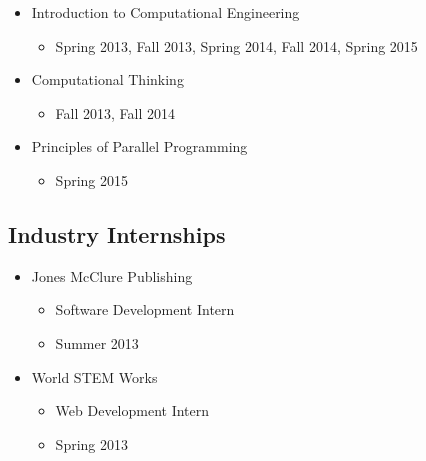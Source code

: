 \documentclass[a4paper]{article}
\begin{document}
\begin{itemize}

    \item{Introduction to Computational Engineering}
    \begin{itemize}
        \item{Spring 2013, Fall 2013, Spring 2014, Fall 2014, Spring 2015}
    \end{itemize}

    \item{Computational Thinking}
    \begin{itemize}
        \item{Fall 2013, Fall 2014}
    \end{itemize}

    \item{Principles of Parallel Programming}
    \begin{itemize}
        \item{Spring 2015}
    \end{itemize}

\end{itemize}





\subsection{Industry Internships}

\begin{itemize}

    \item{Jones McClure Publishing}
    \begin{itemize}
        \item{Software Development Intern}
        \item{Summer 2013}
    \end{itemize}

    \item{World STEM Works}
    \begin{itemize}
        \item{Web Development Intern}
        \item{Spring 2013}
    \end{itemize}

\end{itemize}
\end{document}
